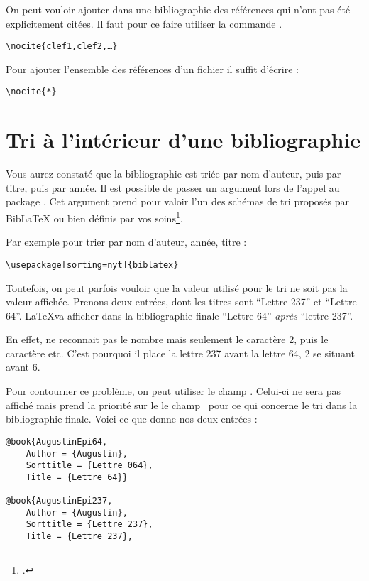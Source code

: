 On peut vouloir ajouter dans une bibliographie des références qui n'ont pas été explicitement citées. Il faut pour ce faire utiliser la commande .

\begin{verbatim}
\nocite{clef1,clef2,…}
\end{verbatim}


Pour ajouter l'ensemble des références d'un fichier  il suffit d'écrire :
\begin{verbatim}
\nocite{*}
\end{verbatim}

\section{Tri à l'intérieur d'une bibliographie}

Vous aurez constaté que la bibliographie est triée par nom d'auteur, puis par titre, puis par année. Il est possible de passer un argument  lors de l'appel au package . Cet argument prend pour valoir l'un des schémas de tri proposés par BibLaTeX ou bien définis par vos soins\footcites[Pour les schémas de tri standards voir][]{biblatex_tri}[pour les schémas personnalisés voir][qui nécéssite l'utilisation de Biber (\cf{} \pageref{biber})]{biblatex_triperso}.

Par exemple pour trier par nom d'auteur, année, titre :

\begin{verbatim}
\usepackage[sorting=nyt]{biblatex}
\end{verbatim}

Toutefois, on peut parfois vouloir que  la valeur utilisé pour le tri ne soit pas la valeur affichée. Prenons deux entrées, dont les titres sont \enquote{Lettre 237} et \enquote{Lettre 64}. \LaTeX va afficher dans la bibliographie finale
\enquote{Lettre 64} \emph{après} \enquote{lettre 237}. 

En effet,  ne reconnait pas le nombre  mais seulement le caractère {2}, puis le caractère  etc. C'est pourquoi il place la lettre 237 avant la lettre 64, 2 se situant avant 6.

Pour contourner ce problème, on peut utiliser le champ . Celui-ci ne sera pas affiché mais prend la priorité sur le le champ  pour ce qui concerne le tri dans la bibliographie finale.  Voici ce que donne nos deux entrées :
\begin{verbatim}
@book{AugustinEpi64,
	Author = {Augustin},
	Sorttitle = {Lettre 064},
	Title = {Lettre 64}}
	
@book{AugustinEpi237,
	Author = {Augustin},
	Sorttitle = {Lettre 237},
	Title = {Lettre 237},
\end{verbatim}

